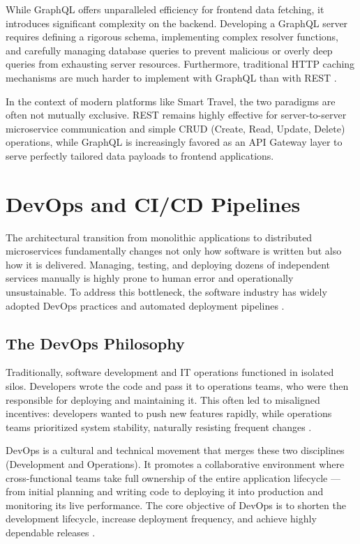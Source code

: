 While GraphQL offers unparalleled efficiency for frontend data fetching, it introduces significant complexity on the backend. Developing a GraphQL server requires defining a rigorous schema, implementing complex resolver functions, and carefully managing database queries to prevent malicious or overly deep queries from exhausting server resources. Furthermore, traditional HTTP caching mechanisms are much harder to implement with GraphQL than with REST \cite{apollo_graphql_basics}.

In the context of modern platforms like Smart Travel, the two paradigms are often not mutually exclusive. REST remains highly effective for server-to-server microservice communication and simple CRUD (Create, Read, Update, Delete) operations, while GraphQL is increasingly favored as an API Gateway layer to serve perfectly tailored data payloads to frontend applications.


\section{DevOps and CI/CD Pipelines}
\label{sec:devops_cicd}

The architectural transition from monolithic applications to distributed microservices fundamentally changes not only how software is written but also how it is delivered. Managing, testing, and deploying dozens of independent services manually is highly prone to human error and operationally unsustainable. To address this bottleneck, the software industry has widely adopted DevOps practices and automated deployment pipelines \cite{aws_devops_what_is}.

\subsection{The DevOps Philosophy}

Traditionally, software development and IT operations functioned in isolated silos. Developers wrote the code and pass it to operations teams, who were then responsible for deploying and maintaining it. This often led to misaligned incentives: developers wanted to push new features rapidly, while operations teams prioritized system stability, naturally resisting frequent changes \cite{atlassian_devops}.

DevOps is a cultural and technical movement that merges these two disciplines (Development and Operations). It promotes a collaborative environment where cross-functional teams take full ownership of the entire application lifecycle — from initial planning and writing code to deploying it into production and monitoring its live performance. The core objective of DevOps is to shorten the development lifecycle, increase deployment frequency, and achieve highly dependable releases \cite{aws_devops_what_is}.

